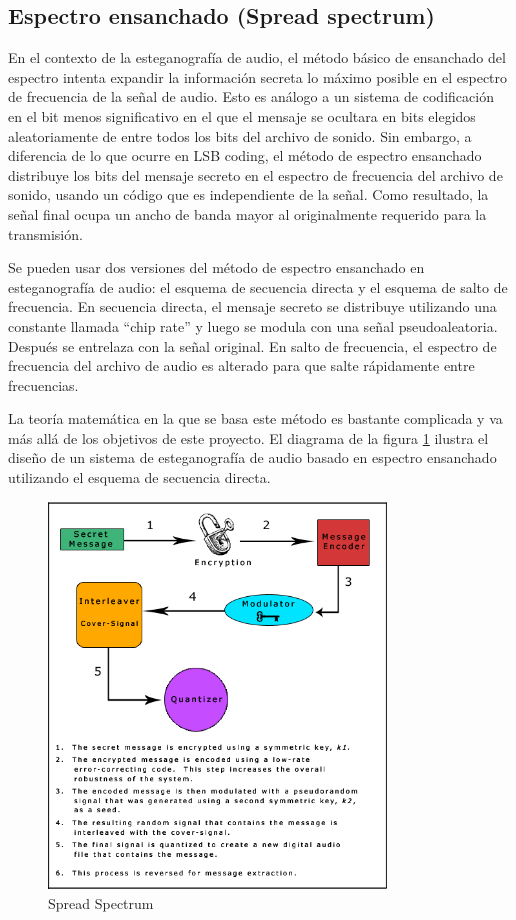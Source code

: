 \documentclass[12pt]{article}
\begin{document}
\subsection{Espectro ensanchado (Spread spectrum)}

En el contexto de la esteganografía de audio, el método básico de ensanchado del espectro intenta expandir la información secreta lo máximo posible en el espectro de frecuencia de la señal de audio. Esto es análogo a un sistema de codificación en el bit menos significativo en el que el mensaje se ocultara en bits elegidos aleatoriamente de entre todos los bits del archivo de sonido. Sin embargo, a diferencia de lo que ocurre en LSB coding, el método de espectro ensanchado distribuye los bits del mensaje secreto en el espectro de frecuencia del archivo de sonido, usando un código que es independiente de la señal. Como resultado, la señal final ocupa un ancho de banda mayor al originalmente requerido para la transmisión.

Se pueden usar dos versiones del método de espectro ensanchado en esteganografía de audio: el esquema de secuencia directa y el esquema de salto de frecuencia. En secuencia directa, el mensaje secreto se distribuye utilizando una constante llamada ``chip rate'' y luego se modula con una señal pseudoaleatoria. Después se entrelaza con la señal original. En salto de frecuencia, el espectro de frecuencia del archivo de audio es alterado para que salte rápidamente entre frecuencias.

La teoría matemática en la que se basa este método es bastante complicada y va más allá de los objetivos de este proyecto. El diagrama de la figura \ref{spreadspectrum} ilustra el diseño de un sistema de esteganografía de audio basado en espectro ensanchado utilizando el esquema de secuencia directa.

\begin{figure}
  \centering
    \includegraphics[width=0.8\textwidth]{img/spreadspectrum}
  \caption{Spread Spectrum}
  \label{spreadspectrum}
\end{figure}
\end{document}
